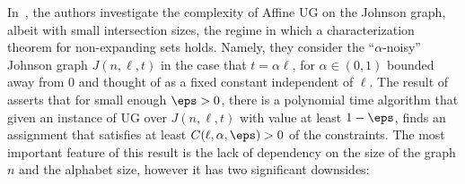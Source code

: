 In~\cite{BBKSS}, the authors investigate the complexity of Affine UG 
on the Johnson graph, albeit with small intersection sizes, the regime in which a characterization theorem for non-expanding sets holds. 
Namely, they consider
the ``$\alpha$-noisy'' Johnson graph $J(n,\ell,t)$ in the case that $t = \alpha \ell$, for $\alpha\in (0,1)$ bounded away from $0$ and thought of as a fixed constant independent of $\ell$.
The result of~\cite{BBKSS} 
asserts that for small enough $\eps>0$, there is a polynomial time algorithm
that given an instance of UG over $J(n,\ell,t)$ with value at least 
$1-\eps$, finds an assignment that satisfies at least $C(\ell,\alpha,\eps)>0$
of the constraints. The most important feature of this result is the lack
of dependency on the size of the graph $n$ and the alphabet size, however 
it has two significant downsides:

